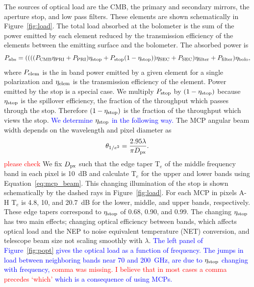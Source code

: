 \documentclass[]{spie}  %
\newcommand{\comr}[1]{\textcolor{red}{#1}}
\newcommand{\comb}[1]{\textcolor{blue}{#1}}
\begin{document}
The sources of optical load are the CMB, the primary and secondary mirrors, the aperture stop, and low pass filters.  
These elements are shown schematically in Figure~\ref{fig:load}. 
The total load absorbed at the bolometer is the sum of the power emitted by each element reduced by the transmission 
efficiency of the elements between the emitting surface and the bolometer.  
The absorbed power is
\begin{equation}
\label{eq:load}
P_{\rm abs} =  (((( P_{\rm CMB} \eta_{\rm PRI} + P_{\rm PRI} ) \eta_{\rm stop} + P_{\rm stop}(1-\eta_{\rm stop}) ) \eta_{\rm SEC} + P_{\rm SEC})\eta_{\rm filter} + P_{\rm filter}) \eta_{\rm bolo},
\end{equation} 
where $P_{\rm elem}$ is the in band power emitted by a given element for a single polarization and $\eta_{\rm elem}$ is the 
transmission efficiency 
of the element. Power emitted by the stop is a special case. We multiply $P_{\rm stop}$ by 
$(1-\eta_{\rm stop})$ because $\eta_{\rm stop}$ is the spillover efficiency, the fraction of the throughput which passes through the 
stop. Therefore $(1-\eta_{\rm stop})$ is the fraction of the throughput which views the stop. \comb{We determine 
$\eta_{\rm stop}$ in the following way. }
The MCP angular beam width depends on the wavelength and pixel diameter as\cite{suzuki2013_thesis}
\begin{equation}
\label{eq:mcp_beam}
\theta_{1/e^2} = \frac{2.95 \lambda}{\pi D_{\rm px}}. 
\end{equation} 
\comr{please check} We fix $D_{\rm px}$ such that 
the edge taper T$_e$ of the middle frequency band in each pixel is 10~dB and calculate T$_e$ for the upper and lower bands 
using Equation~\ref{eq:mcp_beam}. This changing illumination of the stop is shown schematically by 
the dashed rays in Figure~\ref{fig:load}. 
For each MCP in pixels A-H T$_e$ is 4.8, 10, and 20.7~dB for the lower, middle, and upper bands, respectively.  These 
edge tapers correspond to $\eta_{\rm stop}$ of 0.68, 0.90, and 0.99.
The changing $\eta_{\rm stop}$ has two main effects; changing optical efficiency between bands, which affects optical load 
and the NEP to noise equivalent temperature (NET) conversion, and telescope beam size not scaling smoothly with $\lambda$.
\comb{The left panel of Figure~\ref{fig:popt} gives the optical load as a function of frequency. The jumps in load between 
neighboring bands near 70 and 200~GHz, are 
due to $\eta_{\rm stop}$ changing with frequency, \comr{comma was missing. I believe that in most cases a comma precedes `which'} 
which is a consequence of using MCPs.  }
\end{document}
